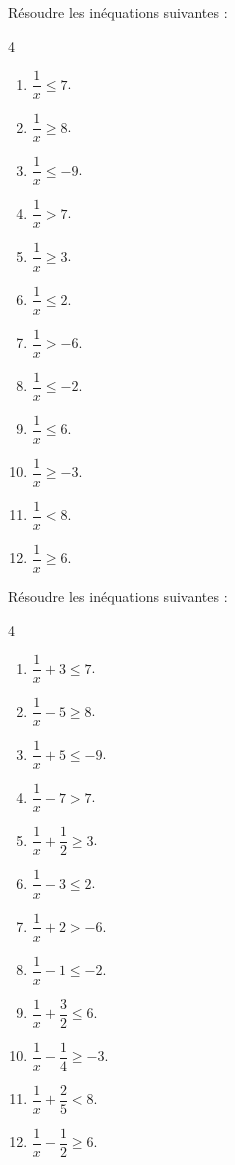 {%
\begin{Exercice}
Résoudre les inéquations suivantes :
\vspace{-0.5cm}
\begin{multicols}{4}
\begin{enumerate}[itemsep=1.5em]
	\item $\dfrac{1}{x} \leqslant 7$.
	\item $\dfrac{1}{x} \geqslant 8$.
	\item $\dfrac{1}{x} \leqslant -9$.
	\item $\dfrac{1}{x}>7$.
	\item $\dfrac{1}{x} \geqslant 3$.
	\item $\dfrac{1}{x} \leqslant 2$.
	\item $\dfrac{1}{x}>-6$.
	\item $\dfrac{1}{x} \leqslant -2$.
	\item $\dfrac{1}{x} \leqslant 6$.
	\item $\dfrac{1}{x} \geqslant -3$.
	\item $\dfrac{1}{x}<8$.\
	\item $\dfrac{1}{x} \geqslant 6$.
\end{enumerate}
\end{multicols}
\end{Exercice}


\begin{Exercice}
Résoudre les inéquations suivantes :
\vspace{-0.5cm}
\begin{multicols}{4}
\begin{enumerate}[itemsep=1.5em]
	\item $\dfrac{1}{x}+3 \leqslant 7$.
	\item $\dfrac{1}{x}-5 \geqslant 8$.
	\item $\dfrac{1}{x} +5\leqslant -9$.
	\item $\dfrac{1}{x}-7>7$.
	\item $\dfrac{1}{x}+\dfrac{1}{2} \geqslant 3$.
	\item $\dfrac{1}{x} -3\leqslant 2$.
	\item $\dfrac{1}{x}+2>-6$.
	\item $\dfrac{1}{x}-1 \leqslant -2$.
	\item $\dfrac{1}{x}+\dfrac{3}{2} \leqslant 6$.
	\item $\dfrac{1}{x} -\dfrac{1}{4}\geqslant -3$.
	\item $\dfrac{1}{x}+\dfrac{2}{5}<8$.\
	\item $\dfrac{1}{x} -\dfrac{1}{2}\geqslant 6$.
\end{enumerate}
\end{multicols}
\end{Exercice}

}
